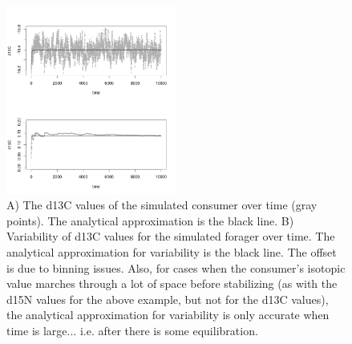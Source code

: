 \documentclass[11pt]{article}
\begin{document}
\begin{figure}[h!]
   \centering
   \includegraphics[width=0.5\textwidth]{fig_d13Cvstime.png}
      \caption{
      A) The d13C values of the simulated consumer over time (gray points). The analytical approximation is the black line.
      B) Variability of d13C values for the simulated forager over time. The analytical approximation for variability is the black line.
      The offset is due to binning issues.
      Also, for cases when the consumer's isotopic value marches through a lot of space before stabilizing (as with the d15N values for the above example, but not for the d13C values), the analytical approximation for variability is only accurate when time is large... i.e. after there is some equilibration.
      }
      \label{fig_time}
\end{figure}
\end{document}
